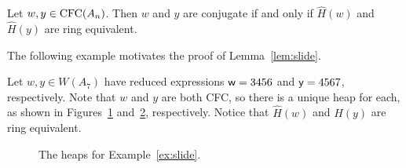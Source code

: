 \begin{theorem}\label{thm:conjiffring} Let $w,y \in \operatorname{\mathrm{CFC}}(A_n)$. Then $w$ and $y$ are conjugate if and only if $\hat{H}(w)$ and $\hat{H}(y)$ are ring equivalent.
\end{theorem}

    The following example motivates the proof of Lemma~\ref{lem:slide}.

\begin{example}\label{ex:slide} Let $w,y \in W(A_7)$ have reduced expressions $\mathsf{w} = 3456$ and $\mathsf{y} = 4567$, respectively. Note that $w$ and $y$ are both CFC, so there is a unique heap for each, as shown in Figures~\ref{fig:slideex0.1} and~\ref{fig:slideex0.2}, respectively. Notice that $\hat{H}(w)$ and $\hat{H}(y)$ are ring equivalent.

\begin{center} \begin{figure}[H] \centering
\begin{subfigure}{0.3\textwidth} \centering
{}
\caption{}\label{fig:slideex0.1}
\end{subfigure}
\begin{subfigure}{0.3\textwidth} \centering
{}
\caption{}\label{fig:slideex0.2}
\end{subfigure}
\caption{The heaps for Example~\ref{ex:slide}.}\label{fig:slideex0}
\end{figure} \end{center}


\end{example}

